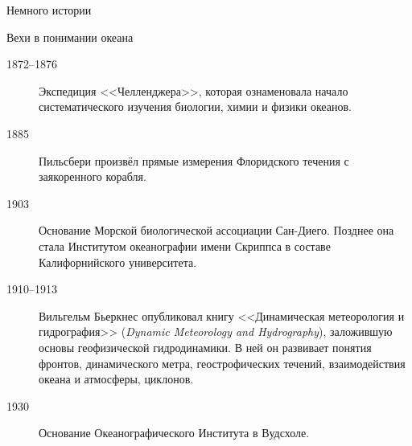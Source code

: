 \begin{chapter}{Немного истории}
\begin{section}{Вехи в понимании океана}
\begin{description}
\item[1872--1876] Экспедиция <<Челленджера>>, которая ознаменовала начало
систематического изучения биологии, химии и физики океанов.
%


\item[1885] Пильсбери произвёл прямые измерения Флоридского течения с
заякоренного корабля.
%


\item[1903] Основание Морской биологической ассоциации Сан-Диего.
Позднее она стала Институтом океанографии имени Скриппса в составе
Калифорнийского университета.
%

\item[1910--1913] Вильгельм Бьеркнес опубликовал
книгу <<Динамическая метеорология и гидрография>> (\textsl{Dynamic Meteorology
and Hydrography}), заложившую основы геофизической гидродинамики. В ней
он развивает понятия фронтов, динамического метра, геострофических течений,
взаимодействия океана и атмосферы, циклонов.
%


\item[1930] Основание Океанографического Института в Вудсхоле.
%




\end{description}
\end{section}
\end{chapter}
